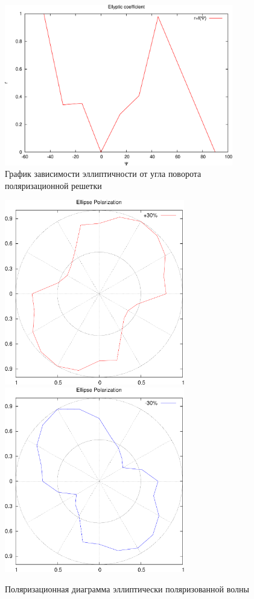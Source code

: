 \documentclass[11pt,a4paper,oneside, reqno]{amsproc}
\begin{document}
\begin{figure}[hb!]
    \begin{center}
        \includegraphics[width=0.89\textwidth]{data3.pdf}
    \end{center}
    \caption{График зависимости эллиптичности от угла поворота поляризационной решетки}
    \label{fig:plot3}
\end{figure}

\begin{figure}[h!]
    \begin{center}
        \includegraphics[width=0.7\textwidth]{data2-1.pdf}
        \includegraphics[width=0.7\textwidth]{data2-2.pdf}
    \end{center}
    \caption{Поляризационная диаграмма эллиптически поляризованной волны}
    \label{fig:plot2}
\end{figure}
\end{document}
